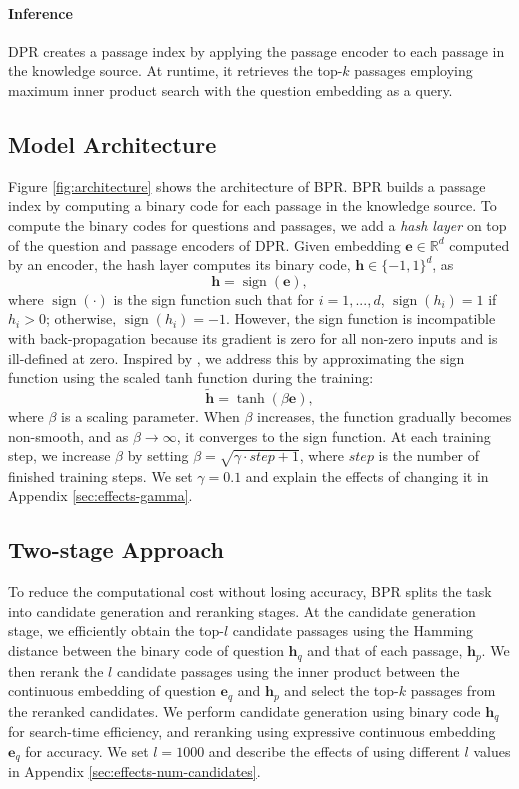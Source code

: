 \documentclass[11pt,a4paper]{article}
\DeclareMathOperator{\sign}{sign}
\begin{document}
\paragraph{Inference}
DPR creates a passage index by applying the passage encoder to each passage in the knowledge source.
At runtime, it retrieves the top-$k$ passages employing maximum inner product search with the question embedding as a query.

\subsection{Model Architecture}
Figure \ref{fig:architecture} shows the architecture of BPR.
BPR builds a passage index by computing a binary code for each passage in the knowledge source.
To compute the binary codes for questions and passages, we add a \textit{hash layer} on top of the question and passage encoders of DPR.
Given embedding $\mathbf{e} \in \mathbb{R}^d$ computed by an encoder, the hash layer computes its binary code, $\mathbf{h} \in \{-1, 1\}^d$, as
\begin{equation}
  \mathbf{h} = \sign(\mathbf{e}),
\end{equation}
where $\sign(\cdot)$ is the sign function such that for $i = 1, ..., d$, $\sign(h_i) = 1$ if $h_i > 0$; otherwise, $\sign(h_i) = -1$.
However, the sign function is incompatible with back-propagation because its gradient is zero for all non-zero inputs and is ill-defined at zero.
Inspired by \citet{Cao2017HashNet:Continuation}, we address this by approximating the sign function using the scaled tanh function during the training:
\begin{equation}
  \mathbf{\tilde{h}} = \tanh(\beta \mathbf{e}),
\end{equation}
where $\beta$ is a scaling parameter.
When $\beta$ increases, the function gradually becomes non-smooth, and as $\beta\to\infty$, it converges to the sign function.
At each training step, we increase $\beta$ by setting $\beta = \sqrt{\gamma\cdot step + 1}$, where $step$ is the number of finished training steps.
We set $\gamma=0.1$ and explain the effects of changing it in Appendix \ref{sec:effects-gamma}.

\subsection{Two-stage Approach}
\label{subsec:approach}
To reduce the computational cost without losing accuracy, BPR splits the task into candidate generation and reranking stages.
At the candidate generation stage, we efficiently obtain the top-$l$ candidate passages using the Hamming distance between the binary code of question $\mathbf{h}_q$ and that of each passage, $\mathbf{h}_p$.
We then rerank the $l$ candidate passages using the inner product between the continuous embedding of question $\mathbf{e}_q$ and $\mathbf{h}_p$ and select the top-$k$ passages from the reranked candidates.
We perform candidate generation using binary code $\mathbf{h}_q$ for search-time efficiency, and reranking using expressive continuous embedding $\mathbf{e}_q$ for accuracy.
We set $l=1000$ and describe the effects of using different $l$ values in Appendix \ref{sec:effects-num-candidates}.
\end{document}
